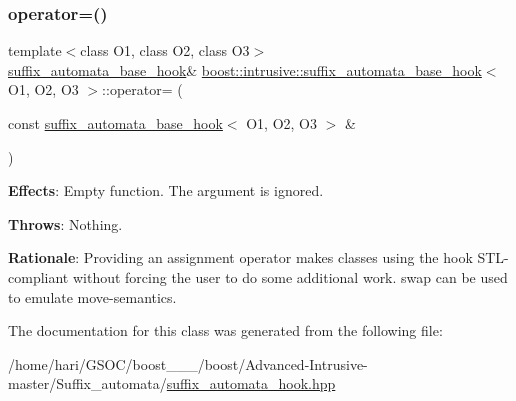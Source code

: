 \subsubsection{\texorpdfstring{operator=()}{operator=()}}
{\footnotesize\ttfamily template$<$class O1, class O2, class O3$>$ \\
\hyperlink{classboost_1_1intrusive_1_1suffix__automata__base__hook}{suffix\+\_\+automata\+\_\+base\+\_\+hook}\& \hyperlink{classboost_1_1intrusive_1_1suffix__automata__base__hook}{boost\+::intrusive\+::suffix\+\_\+automata\+\_\+base\+\_\+hook}$<$ O1, O2, O3 $>$\+::operator= (\begin{DoxyParamCaption}\item[{const \hyperlink{classboost_1_1intrusive_1_1suffix__automata__base__hook}{suffix\+\_\+automata\+\_\+base\+\_\+hook}$<$ O1, O2, O3 $>$ \&}]{ }\end{DoxyParamCaption})}

{\bfseries Effects}\+: Empty function. The argument is ignored.

{\bfseries Throws}\+: Nothing.

{\bfseries Rationale}\+: Providing an assignment operator makes classes using the hook S\+T\+L-\/compliant without forcing the user to do some additional work. {\ttfamily swap} can be used to emulate move-\/semantics. 

The documentation for this class was generated from the following file\+:\begin{DoxyCompactItemize}
\item 
/home/hari/\+G\+S\+O\+C/boost\+\_\+\_\+\_/boost/\+Advanced-\/\+Intrusive-\/master/\+Suffix\+\_\+automata/\hyperlink{suffix__automata__hook_8hpp}{suffix\+\_\+automata\+\_\+hook.\+hpp}\end{DoxyCompactItemize}
